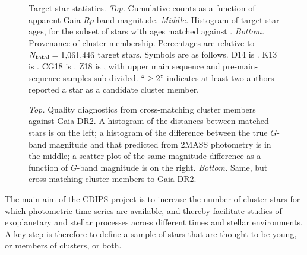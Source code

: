 \documentclass[12pt,twocolumn,tighten]{aastex62}
\begin{document}
\begin{figure}[!t]
	\begin{center}
		\leavevmode
		\vspace{-0.8cm}
		\vspace{-0.8cm}
	\end{center}
	\vspace{-0.8cm}
	\caption{
		Target star statistics.
		{\it Top.} Cumulative counts as a function of apparent Gaia $Rp$-band
		magnitude.  
		{\it Middle.} Histogram of target star ages, for the subset of
		stars with ages matched against \citet{Kharchenko_et_al_2013}.
		{\it Bottom.} Provenance of cluster membership.  Percentages are
		relative to $N_{\rm total}=1{,}061{,}446$ target stars. Symbols
		are as follows.
		D14 is \citet{dias_proper_2014}.
		K13 is \citet{Kharchenko_et_al_2013}.
		CG18 is \citet{cantat-gaudin_gaia_2018}.
		Z18 is \citet{zari_3d_2018}, with upper main sequence and
		pre-main-sequence samples sub-divided.
		``$\geq 2$'' indicates at least two authors reported a star as a
		candidate cluster member.
		\label{fig:cdips_targets}
	}
\end{figure}

\begin{figure}[!t]
	\vspace{-1.1cm}
	\vspace{-0.8cm}
	\caption{
    {\it Top.} Quality diagnostics from cross-matching
    \cite{Kharchenko_et_al_2013} cluster members against Gaia-DR2.  A
    histogram of the distances between matched stars is on the left; a
    histogram of the difference between the true $G$-band magnitude
    and that predicted from 2MASS photometry is in the middle; a
    scatter plot of the same magnitude difference as a function of
    $G$-band magnitude is on the right.
		{\it Bottom.} Same, but cross-matching \cite{dias_proper_2014}
		cluster members to Gaia-DR2.
	}
	\label{fig:xmatch_info}
\end{figure}

The main aim of the CDIPS project is to increase the number of cluster
stars for which photometric time-series are available, and thereby
facilitate studies of exoplanetary and stellar processes across
different times and stellar environments.  A key step is therefore to
define a sample of stars that are thought to be young, or members of
clusters, or both.
\end{document}
